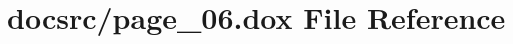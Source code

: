 \hypertarget{page__06_8dox}{\section{docsrc/page\-\_\-06.dox File Reference}
\label{page__06_8dox}
}

